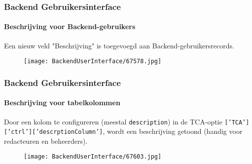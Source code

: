 \begin{frame}[fragile]
	\frametitle{Backend Gebruikersinterface}
	\framesubtitle{Beschrijving voor Backend-gebruikers}

	Een nieuw veld "Beschrijving" is toegevoegd aan Backend-gebruikersrecords.

	\begin{figure}
		\texttt{[image: BackendUserInterface/67578.jpg]}
	\end{figure}

\end{frame}

\begin{frame}[fragile]
	\frametitle{Backend Gebruikersinterface}
	\framesubtitle{Beschrijving voor tabelkolommen}

	Door een kolom te configureren (meestal \texttt{description}) in de TCA-optie \texttt{['TCA']['ctrl']['descrptionColumn']},
	wordt een beschrijving getoond (handig voor redacteuren en beheerders).

	\begin{figure}
		\texttt{[image: BackendUserInterface/67603.jpg]}
	\end{figure}

\end{frame}

